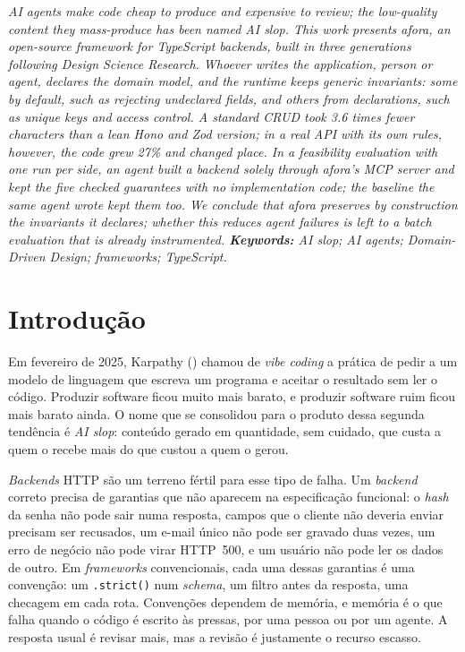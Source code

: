 \documentclass[a4paper,12pt]{article}
\renewenvironment{abstract}{%
  \list{}{\advance\topsep by6pt\relax
    \leftmargin=0.8cm
    \labelwidth=0pt
    \listparindent=0pt
    \itemindent\listparindent
    \rightmargin\leftmargin}\item[\hskip\labelsep\bfseries\itshape Abstract.]\itshape}%
  {\endlist}
\newcommand{\estr}[1]{\textit{#1}}
\begin{document}
\vspace{6pt}

\begin{abstract}
AI agents make code cheap to produce and expensive to review; the low-quality content they mass-produce has been named AI slop. This work presents afora, an open-source framework for TypeScript backends, built in three generations following Design Science Research. Whoever writes the application, person or agent, declares the domain model, and the runtime keeps generic invariants: some by default, such as rejecting undeclared fields, and others from declarations, such as unique keys and access control. A standard CRUD took 3.6 times fewer characters than a lean Hono and Zod version; in a real API with its own rules, however, the code grew 27\% and changed place. In a feasibility evaluation with one run per side, an agent built a backend solely through afora's MCP server and kept the five checked guarantees with no implementation code; the baseline the same agent wrote kept them too. We conclude that afora preserves by construction the invariants it declares; whether this reduces agent failures is left to a batch evaluation that is already instrumented.
\end{abstract}
\noindent\textbf{Keywords:} AI slop; AI agents; Domain-Driven Design; frameworks; TypeScript.

\vspace{12pt}

\section{Introdução}\label{sec:intro}

Em fevereiro de 2025, Karpathy (\citeyear{karpathy2025}) chamou de \estr{vibe coding} a prática de pedir a um modelo de linguagem que escreva um programa e aceitar o resultado sem ler o código. Produzir software ficou muito mais barato, e produzir software ruim ficou mais barato ainda. O nome que se consolidou para o produto dessa segunda tendência é \estr{AI slop}: conteúdo gerado em quantidade, sem cuidado, que custa a quem o recebe mais do que custou a quem o gerou.

\estr{Backends} HTTP são um terreno fértil para esse tipo de falha. Um \estr{backend} correto precisa de garantias que não aparecem na especificação funcional: o \estr{hash} da senha não pode sair numa resposta, campos que o cliente não deveria enviar precisam ser recusados, um e-mail único não pode ser gravado duas vezes, um erro de negócio não pode virar HTTP~500, e um usuário não pode ler os dados de outro. Em \estr{frameworks} convencionais, cada uma dessas garantias é uma convenção: um \texttt{.strict()} num \estr{schema}, um filtro antes da resposta, uma checagem em cada rota. Convenções dependem de memória, e memória é o que falha quando o código é escrito às pressas, por uma pessoa ou por um agente. A resposta usual é revisar mais, mas a revisão é justamente o recurso escasso.
\end{document}
